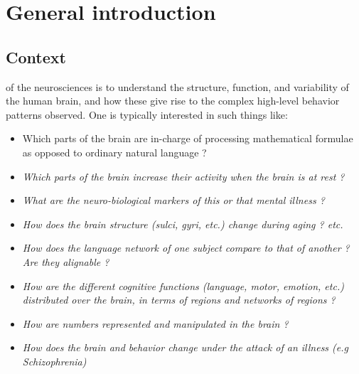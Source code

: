 \chapter{General introduction}
\label{chap:intro}

\minitoc

\section{Context}
 of the neurosciences is to understand the structure, function, and variability of the human brain, and how these give rise to the complex high-level behavior patterns observed. One is typically interested in such things like:
\begin{itemize}
  \item Which parts of the brain are in-charge of processing mathematical formulae as opposed to ordinary natural language ?
  \item \textit{Which parts of the brain increase their activity when the brain is at rest ?}
  \item \textit{What are the neuro-biological markers of this or that mental illness ?}
  \item \textit{How does the brain structure (sulci, gyri, etc.) change during aging ? etc.}
 \item \textit{How does the language network of one subject compare to that of another ? Are they alignable ?}
 \item \textit{How are the different cognitive functions (language, motor, emotion, etc.) distributed over the brain, in terms of regions and networks of regions ?}
 \item \textit{How are numbers represented and manipulated in the brain ?}
\item \textit{How does the brain and behavior change under the attack of an illness (e.g Schizophrenia)}   
\end{itemize}

